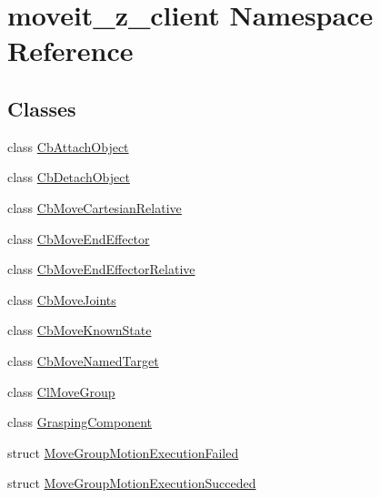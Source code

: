 \hypertarget{namespacemoveit__z__client}{}\section{moveit\+\_\+z\+\_\+client Namespace Reference}
\label{namespacemoveit__z__client}
\subsection*{Classes}
\begin{DoxyCompactItemize}
\item 
class \hyperlink{classmoveit__z__client_1_1CbAttachObject}{Cb\+Attach\+Object}
\item 
class \hyperlink{classmoveit__z__client_1_1CbDetachObject}{Cb\+Detach\+Object}
\item 
class \hyperlink{classmoveit__z__client_1_1CbMoveCartesianRelative}{Cb\+Move\+Cartesian\+Relative}
\item 
class \hyperlink{classmoveit__z__client_1_1CbMoveEndEffector}{Cb\+Move\+End\+Effector}
\item 
class \hyperlink{classmoveit__z__client_1_1CbMoveEndEffectorRelative}{Cb\+Move\+End\+Effector\+Relative}
\item 
class \hyperlink{classmoveit__z__client_1_1CbMoveJoints}{Cb\+Move\+Joints}
\item 
class \hyperlink{classmoveit__z__client_1_1CbMoveKnownState}{Cb\+Move\+Known\+State}
\item 
class \hyperlink{classmoveit__z__client_1_1CbMoveNamedTarget}{Cb\+Move\+Named\+Target}
\item 
class \hyperlink{classmoveit__z__client_1_1ClMoveGroup}{Cl\+Move\+Group}
\item 
class \hyperlink{classmoveit__z__client_1_1GraspingComponent}{Grasping\+Component}
\item 
struct \hyperlink{structmoveit__z__client_1_1MoveGroupMotionExecutionFailed}{Move\+Group\+Motion\+Execution\+Failed}
\item 
struct \hyperlink{structmoveit__z__client_1_1MoveGroupMotionExecutionSucceded}{Move\+Group\+Motion\+Execution\+Succeded}
\end{DoxyCompactItemize}
